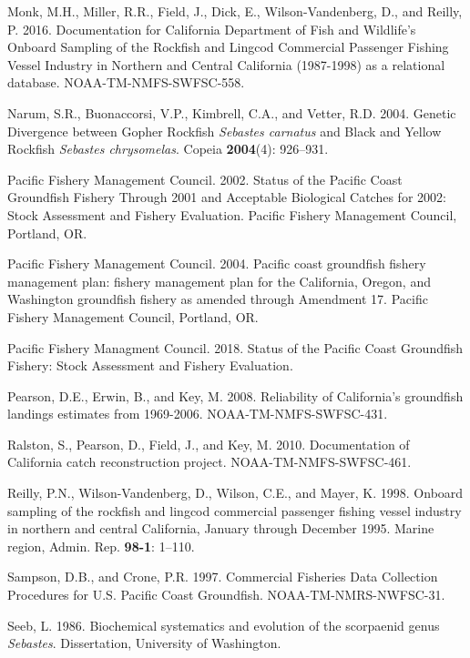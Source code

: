 \documentclass[12pt,]{article}
\begin{document}
\hypertarget{ref-Monk2016}{}
Monk, M.H., Miller, R.R., Field, J., Dick, E., Wilson-Vandenberg, D.,
and Reilly, P. 2016. Documentation for California Department of Fish and
Wildlife's Onboard Sampling of the Rockfish and Lingcod Commercial
Passenger Fishing Vessel Industry in Northern and Central California
(1987-1998) as a relational database. NOAA-TM-NMFS-SWFSC-558.

\hypertarget{ref-Narum2004}{}
Narum, S.R., Buonaccorsi, V.P., Kimbrell, C.A., and Vetter, R.D. 2004.
Genetic Divergence between Gopher Rockfish \emph{Sebastes carnatus} and
Black and Yellow Rockfish \emph{Sebastes chrysomelas}. Copeia
\textbf{2004}(4): 926--931.

\hypertarget{ref-PFMC2002}{}
Pacific Fishery Management Council. 2002. Status of the Pacific Coast
Groundfish Fishery Through 2001 and Acceptable Biological Catches for
2002: Stock Assessment and Fishery Evaluation. Pacific Fishery
Management Council, Portland, OR.

\hypertarget{ref-PFMC2004}{}
Pacific Fishery Management Council. 2004. Pacific coast groundfish
fishery management plan: fishery management plan for the California,
Oregon, and Washington groundfish fishery as amended through Amendment
17. Pacific Fishery Management Council, Portland, OR.

\hypertarget{ref-PSMFC2018}{}
Pacific Fishery Managment Council. 2018. Status of the Pacific Coast
Groundfish Fishery: Stock Assessment and Fishery Evaluation.

\hypertarget{ref-Pearson2008}{}
Pearson, D.E., Erwin, B., and Key, M. 2008. Reliability of California's
groundfish landings estimates from 1969-2006. NOAA-TM-NMFS-SWFSC-431.

\hypertarget{ref-Ralston2010}{}
Ralston, S., Pearson, D., Field, J., and Key, M. 2010. Documentation of
California catch reconstruction project. NOAA-TM-NMFS-SWFSC-461.

\hypertarget{ref-Reilly1998}{}
Reilly, P.N., Wilson-Vandenberg, D., Wilson, C.E., and Mayer, K. 1998.
Onboard sampling of the rockfish and lingcod commercial passenger
fishing vessel industry in northern and central California, January
through December 1995. Marine region, Admin. Rep. \textbf{98-1}: 1--110.

\hypertarget{ref-Sampson1997}{}
Sampson, D.B., and Crone, P.R. 1997. Commercial Fisheries Data
Collection Procedures for U.S. Pacific Coast Groundfish.
NOAA-TM-NMRS-NWFSC-31.

\hypertarget{ref-Seeb1986}{}
Seeb, L. 1986. Biochemical systematics and evolution of the scorpaenid
genus \emph{Sebastes}. Dissertation, University of Washington.
\end{document}
